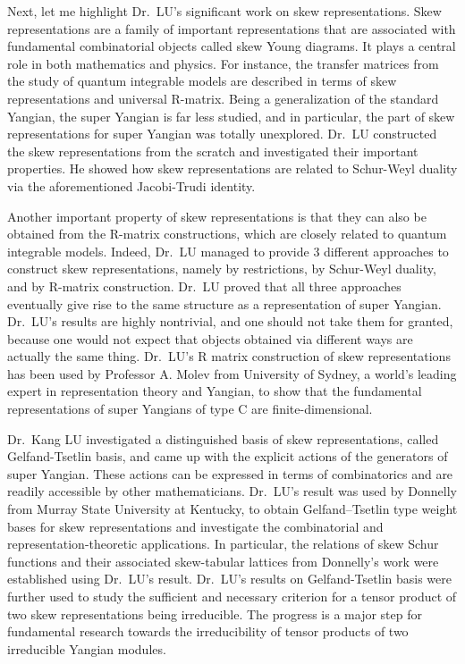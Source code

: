 \documentclass[12pt]{amsart} %
\begin{document}
Next, let me highlight Dr.\ LU's significant work on skew representations. Skew representations are a family of important representations that are associated with fundamental combinatorial objects called skew Young diagrams. It plays a central role in both mathematics and physics. For instance, the transfer matrices from the study of quantum integrable models are described in terms of skew representations and universal R-matrix. Being a generalization of the standard Yangian, the super Yangian is far less studied, and in particular, the part of skew representations for super Yangian was totally unexplored.  Dr.\ LU constructed the skew representations from the scratch and investigated their important properties. He showed how skew representations are related to Schur-Weyl duality via the aforementioned Jacobi-Trudi identity. 


Another important property of skew representations is that they can also be obtained from the R-matrix constructions, which are closely related to quantum integrable models. Indeed, Dr.\ LU managed to provide 3 different approaches to construct skew representations, namely by restrictions, by Schur-Weyl duality, and by R-matrix construction. Dr.\ LU proved that all three approaches eventually give rise to the same structure as a representation of super Yangian. Dr.\ LU's results are highly nontrivial, and one should not take them for granted, because one would not expect that objects obtained via different ways are actually the same thing. Dr.\ LU's R matrix construction of skew representations has been used by Professor A. Molev from University of Sydney, a world's leading expert in representation theory and Yangian, to show that the fundamental representations of super Yangians of type C are finite-dimensional. %

Dr.\ Kang LU investigated a distinguished basis of skew representations, called Gelfand-Tsetlin basis, and came up with the explicit actions of the generators of super Yangian. These actions can be expressed in terms of combinatorics and are readily accessible by other mathematicians. Dr.\ LU's result was used by Donnelly from Murray State University at Kentucky, to obtain Gelfand–Tsetlin type weight bases for skew representations and investigate the combinatorial and representation-theoretic applications. In particular, the relations of skew Schur functions and their associated skew-tabular lattices from Donnelly's work were established using Dr.\ LU's result. Dr.\ LU's results on Gelfand-Tsetlin basis were further used to study the sufficient and necessary criterion for a tensor product of two skew representations being irreducible. The progress is a major step for fundamental research towards the irreducibility of tensor products of two irreducible Yangian modules.
\end{document}
